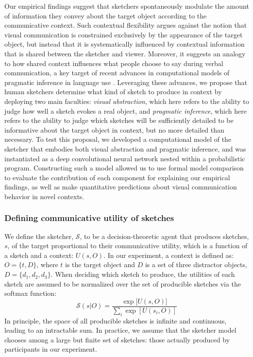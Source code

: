 \documentclass{svjour3}
\begin{document}
Our empirical findings suggest that sketchers spontaneously modulate the amount of information they convey about the target object according to the communicative context. 
Such contextual flexibility argues against the notion that visual communication is constrained exclusively by the appearance of the target object, but instead that it is systematically influenced by contextual information that is shared between the sketcher and viewer. 
Moreover, it suggests an analogy to how shared context influences what people choose to say during verbal communication, a key target of recent advances in computational models of pragmatic inference in language use \citep*{frank2012predicting,goodman2013knowledge,franke2016probabilistic,bergen2016pragmatic}.
Leveraging these advances, we propose that human sketchers determine what kind of sketch to produce in context by deploying two main faculties: \textit{visual abstraction}, which here refers to the ability to judge how well a sketch evokes a real object, and \textit{pragmatic inference}, which here refers to the ability to judge which sketches will be sufficiently detailed to be informative about the target object in context, but no more detailed than necessary. 
To test this proposal, we developed a computational model of the sketcher that embodies both visual abstraction and pragmatic inference, and was instantiated as a deep convolutional neural network nested within a probabilistic program. 
Constructing such a model allowed us to use formal model comparison to evaluate the contribution of each component for explaining our empirical findings, as well as make quantitative predictions about visual communication behavior in novel contexts.


\subsubsection*{Defining communicative utility of sketches}

We define the sketcher, $\mathcal{S}$, to be a decision-theoretic agent that produces sketches, $s$, of the target proportional to their communicative utility, which is a function of a sketch and a context: $U(s,O)$.
In our experiment, a context is defined as:
$O = \{t,D\}$, where $t$ is the target object and $D$ is a set of three distractor objects, $D=\{d_1,d_2,d_3\}$.  
When deciding which sketch to produce, the utilities of each sketch are assumed to be normalized over the set of producible sketches via the softmax function: 
\begin{equation} \label{sketcher_distribution}
\mathcal{S}(s|O) = \frac {\exp [{U(s,O)]}} {\sum_{i} {\exp [U(s_i,O)]}}
\end{equation}
In principle, the space of all producible sketches is infinite and continuous, leading to an intractable sum.
In practice, we assume that the sketcher model chooses among a large but finite set of sketches: those actually produced by participants in our experiment.
\end{document}
